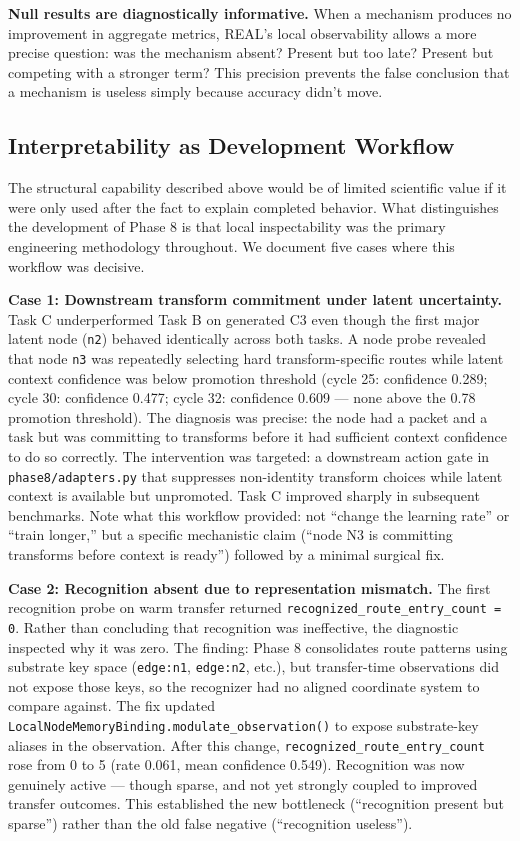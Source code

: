 \documentclass[letterpaper]{article}
\begin{document}
\textbf{Null results are diagnostically informative.} When a mechanism produces no improvement in aggregate metrics, REAL's local observability allows a more precise question: was the mechanism absent? Present but too late? Present but competing with a stronger term? This precision prevents the false conclusion that a mechanism is useless simply because accuracy didn't move.

\subsection{Interpretability as Development Workflow}

The structural capability described above would be of limited scientific value if it were only used after the fact to explain completed behavior. What distinguishes the development of Phase 8 is that local inspectability was the primary engineering methodology throughout. We document five cases where this workflow was decisive.

\textbf{Case 1: Downstream transform commitment under latent uncertainty.} Task C underperformed Task B on generated C3 even though the first major latent node (\texttt{n2}) behaved identically across both tasks. A node probe revealed that node \texttt{n3} was repeatedly selecting hard transform-specific routes while latent context confidence was below promotion threshold (cycle 25: confidence 0.289; cycle 30: confidence 0.477; cycle 32: confidence 0.609 — none above the 0.78 promotion threshold). The diagnosis was precise: the node had a packet and a task but was committing to transforms before it had sufficient context confidence to do so correctly. The intervention was targeted: a downstream action gate in \texttt{phase8/adapters.py} that suppresses non-identity transform choices while latent context is available but unpromoted. Task C improved sharply in subsequent benchmarks. Note what this workflow provided: not ``change the learning rate'' or ``train longer,'' but a specific mechanistic claim (``node N3 is committing transforms before context is ready'') followed by a minimal surgical fix.

\textbf{Case 2: Recognition absent due to representation mismatch.} The first recognition probe on warm transfer returned \texttt{recognized\_route\_entry\_count = 0}. Rather than concluding that recognition was ineffective, the diagnostic inspected why it was zero. The finding: Phase 8 consolidates route patterns using substrate key space (\texttt{edge:n1}, \texttt{edge:n2}, etc.), but transfer-time observations did not expose those keys, so the recognizer had no aligned coordinate system to compare against. The fix updated \texttt{LocalNodeMemoryBinding.modulate\_observation()} to expose substrate-key aliases in the observation. After this change, \texttt{recognized\_route\_entry\_count} rose from 0 to 5 (rate 0.061, mean confidence 0.549). Recognition was now genuinely active — though sparse, and not yet strongly coupled to improved transfer outcomes. This established the new bottleneck (``recognition present but sparse'') rather than the old false negative (``recognition useless'').
\end{document}
